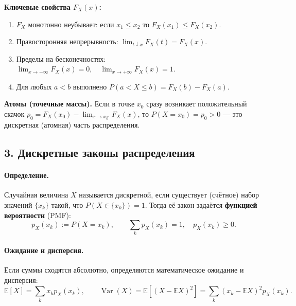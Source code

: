 \medskip
\textbf{Ключевые свойства $F_X(x)$:}
\begin{enumerate}
  \item $F_X$ монотонно неубывает: если $x_1\le x_2$ то $F_X(x_1)\le F_X(x_2)$.
  \item Правосторонняя непрерывность: $\displaystyle \lim_{t\downarrow x} F_X(t)=F_X(x)$.
  \item Пределы на бесконечностях: $\displaystyle \lim_{x\to -\infty} F_X(x)=0,\quad \lim_{x\to +\infty} F_X(x)=1$.
  \item Для любых $a<b$ выполнено $P(a<X\le b)=F_X(b)-F_X(a)$.
\end{enumerate}

\medskip
\textbf{Атомы (точечные массы).} Если в точке $x_0$ сразу возникает положительный скачок $p_0=F_X(x_0)-\lim_{x\to x_0^-}F_X(x)$, то $P(X=x_0)=p_0>0$ — это дискретная (атомная) часть распределения.

\subsection*{3. Дискретные законы распределения}

\paragraph{Определение.} Случайная величина $X$ называется дискретной, если существует (счётное) набор значений $\{x_k\}$ такой, что $P(X\in\{x_k\})=1$. Тогда её закон задаётся \textbf{функцией вероятности} (PMF):
\[
p_X(x_k) := P(X=x_k),\qquad \sum_k p_X(x_k)=1,\quad p_X(x_k)\ge0.
\]

\paragraph{Ожидание и дисперсия.} Если суммы сходятся абсолютно, определяются математическое ожидание и дисперсия:
\[
\mathbb{E}[X] = \sum_k x_k p_X(x_k),\qquad
\operatorname{Var}(X)=\mathbb{E}[(X-\mathbb{E}X)^2]=\sum_k (x_k-\mathbb{E}X)^2 p_X(x_k).
\]


